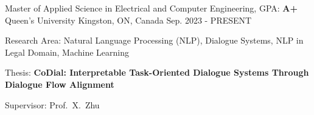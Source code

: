 

\begin{cventries}

  \cventry
    {Master of Applied Science in Electrical and Computer Engineering, GPA: \textbf{A+}} %
    {Queen's University} %
    {Kingston, ON, Canada} %
    {Sep. 2023 - PRESENT} %
    {
      \begin{cvitems}
        \item{
          Research Area: Natural Language Processing (NLP), Dialogue Systems, NLP in Legal Domain, Machine Learning
        }
        \item{Thesis: \textbf{CoDial: Interpretable Task-Oriented Dialogue Systems Through Dialogue Flow Alignment}}
        \item{
          Supervisor: Prof.~X.~Zhu
        }
      \end{cvitems}
    }


\end{cventries}
